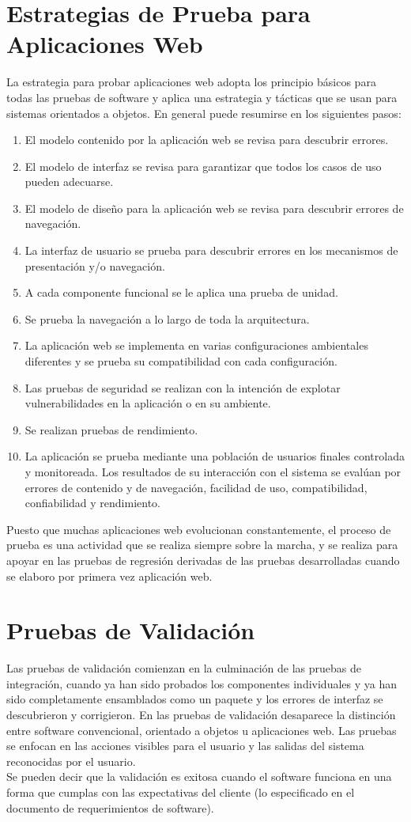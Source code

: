 \section{Estrategias de Prueba para Aplicaciones Web}
La estrategia para probar aplicaciones web adopta los principio básicos para todas las pruebas de software y aplica una estrategia y tácticas que se usan para sistemas orientados a objetos. En general puede resumirse en los siguientes pasos:
\begin{enumerate}
	\item El modelo contenido por la aplicación web se revisa para descubrir errores.
	\item El modelo de interfaz se revisa para garantizar que todos los casos de uso pueden adecuarse.
	\item El modelo de diseño para la aplicación web se revisa para descubrir errores de navegación.
	\item La interfaz de usuario se prueba para descubrir errores en los mecanismos de presentación y/o navegación.
	\item A cada componente funcional se le aplica una prueba de unidad.
	\item Se prueba la navegación a lo largo de toda la arquitectura.
	\item La aplicación web se implementa en varias configuraciones ambientales diferentes y se prueba su compatibilidad con cada configuración.
	\item Las pruebas de seguridad se realizan con la intención de explotar vulnerabilidades en la aplicación o en su ambiente.
	\item Se realizan pruebas de rendimiento.
	\item La aplicación se prueba mediante una población de usuarios finales controlada y monitoreada. Los resultados de su interacción con el sistema se evalúan por errores de contenido y de navegación, facilidad de uso, compatibilidad, confiabilidad y rendimiento.
\end{enumerate}
Puesto que muchas aplicaciones web evolucionan constantemente, el proceso de prueba es una actividad que se realiza siempre sobre la marcha, y se realiza para apoyar en las pruebas de regresión derivadas de las pruebas desarrolladas cuando se elaboro por primera vez aplicación web.
\section{Pruebas de Validación}
Las pruebas de validación comienzan en la culminación de las pruebas de integración, cuando ya han sido probados los componentes individuales y ya han sido completamente ensamblados como un paquete y los errores de interfaz se descubrieron y corrigieron. En las pruebas de validación desaparece la distinción entre software convencional, orientado a objetos u aplicaciones web. Las pruebas se enfocan en las acciones visibles para el usuario y las salidas del sistema reconocidas por el usuario.\\
Se pueden decir que la validación es exitosa cuando el software funciona en una forma que cumplas con las expectativas del cliente (lo especificado en el documento de requerimientos de software).
